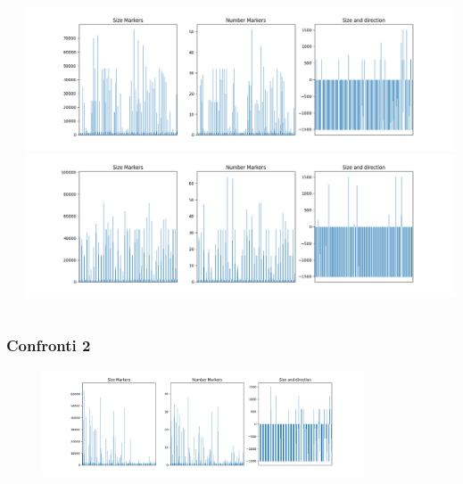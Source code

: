 \documentclass{beamer}[10pt]
\begin{document}
\begin{frame}
\begin{columns}[T]
\begin{column}{0.33\textwidth}
\begin{center}
      \end{center}
    \end{column}
    \begin{column}{0.33\textwidth}
      \begin{center}
        \includegraphics[width=\textwidth]{../img/unical-figure.png}
        \includegraphics[width=\textwidth]{../img/youtube-figure.png}
      \end{center}
    \end{column}
  \end{columns}
\end{frame}

\begin{frame}
  \frametitle{Confronti 2}
  \begin{figure}
    \centering
    \includegraphics[width=0.851\textwidth]{../img/random-figure.png}
  \end{figure}
\end{frame}


\end{document}

